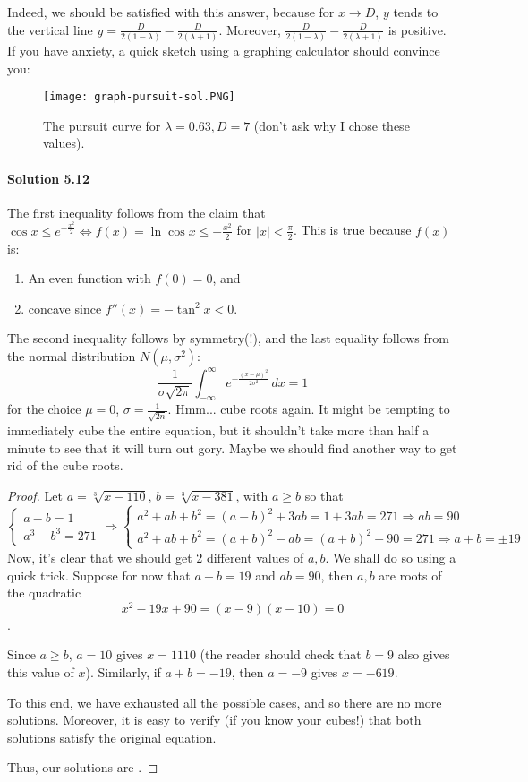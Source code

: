 \documentclass[../main.tex]{subfiles}
\begin{document}
\begin{enumerate}
Indeed, we should be satisfied with this answer, because for $x \to D$, $y$ tends to the vertical line $y=\frac{D}{2(1-\lambda)}-\frac{D}{2(\lambda+1)}$. Moreover, $\frac{D}{2(1-\lambda)}-\frac{D}{2(\lambda+1)}$ is positive. If you have anxiety, a quick sketch using a graphing calculator should convince you:
\begin{figure}[H]
    \centering
    \texttt{[image: graph-pursuit-sol.PNG]}
    \caption{The pursuit curve for $\lambda=0.63, D=7$ (don't ask why I chose these values).}
    \label{fig:graph-pursuit-sol}
\end{figure}
\end{enumerate}

\paragraph{Solution 5.12}
The first inequality follows from the claim that $\cos{x} \leq e^{-\frac{x^2}{2}} \Longleftrightarrow f(x)=\ln{\cos{x}} \leq -\frac{x^2}{2}$ for $|x|<\frac{\pi}{2}$. This is true because $f(x)$ is:
\begin{enumerate}
    \item An even function with $f(0)=0$, and
    \item concave since $f''(x)=-\tan^2{x} < 0$.
\end{enumerate}
The second inequality follows by symmetry(!), and the last equality follows from the normal distribution $N(\mu, \sigma^2)$:
$$\frac{1}{\sigma\sqrt{2\pi}}\int_{-\infty}^{\infty}e^{-\frac{(x-\mu)^2}{2\sigma^2}} \,dx = 1$$ for the choice $\mu = 0$, $ \sigma=\frac{1}{\sqrt{2n}}$.
Hmm... cube roots again. It might be tempting to immediately cube the entire equation, but it shouldn't take more than half a minute to see that it will turn out gory. Maybe we should find another way to get rid of the cube roots.

\begin{proof}
    Let $a=\sqrt[3]{x-110}$, $b=\sqrt[3]{x-381}$, with $a\geq b$ so that
    $$\begin{cases}
        a-b=1 \\
        a^3-b^3=271
    \end{cases}
    \Longrightarrow 
    \begin{cases}
        a^2+ab+b^2=(a-b)^2+3ab=1+3ab=271 \Longrightarrow ab=90 \\
        a^2+ab+b^2=(a+b)^2-ab=(a+b)^2-90=271 \Longrightarrow a+b=\pm 19
    \end{cases}$$
Now, it's clear that we should get 2 different values of $a,b$. We shall do so using a quick trick. Suppose for now that $a+b=19$ and $ab=90$, then $a, b$ are roots of the quadratic $$x^2-19x+90=(x-9)(x-10)=0$$.

Since $a\geq b$, $a=10$ gives $x=1110$ (the reader should check that $b=9$ also gives this value of $x$). Similarly, if $a+b=-19$, then $a=-9$ gives $x=-619$.

To this end, we have exhausted all the possible cases, and so there are no more solutions. Moreover, it is easy to verify (if you know your cubes!) that both solutions satisfy the original equation.

Thus, our solutions are .
\end{proof}
\end{document}
